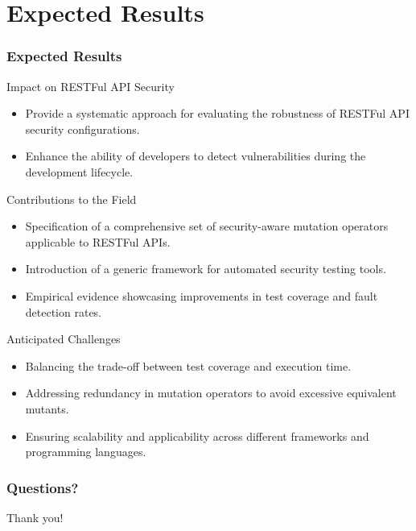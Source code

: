 \documentclass[12pt]{beamer}
\theoremstyle{remark}
\theoremstyle{definition}
\begin{document}
\section{Expected Results}


\begin{frame}[allowframebreaks]
\frametitle{Expected Results}
\begin{block}{Impact on RESTFul API Security}
\begin{itemize}
    \item Provide a systematic approach for evaluating the robustness of RESTFul API security configurations.
    \item Enhance the ability of developers to detect vulnerabilities during the development lifecycle.
\end{itemize}
\end{block}

\begin{block}{Contributions to the Field}
\begin{itemize}
    \item Specification of a comprehensive set of security-aware mutation operators applicable to RESTFul APIs.
    \item Introduction of a generic framework for automated security testing tools.
    \item Empirical evidence showcasing improvements in test coverage and fault detection rates.
\end{itemize}
\end{block}

\begin{block}{Anticipated Challenges}
\begin{itemize}
    \item Balancing the trade-off between test coverage and execution time.
    \item Addressing redundancy in mutation operators to avoid excessive equivalent mutants.
    \item Ensuring scalability and applicability across different frameworks and programming languages.
\end{itemize}
\end{block}
\end{frame}

\begin{frame}
  \frametitle{Questions?}
  \huge{Thank you!}
\end{frame}

\nocite{*}
\printbibliography[]
\end{document}
